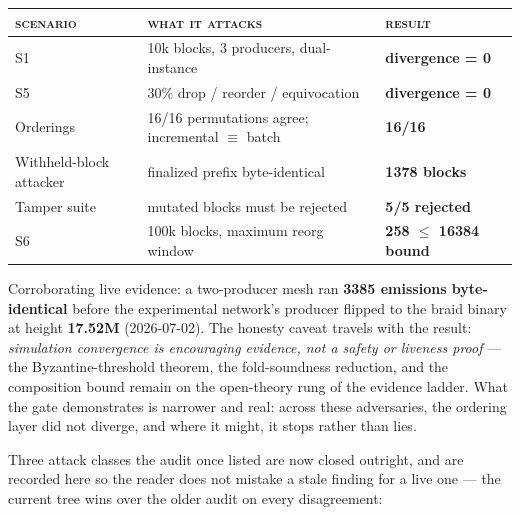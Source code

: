 \documentclass[10pt,a4paper]{article}
\newcommand{\measured}[1]{\textcolor{sigilcyan}{\textbf{#1}}}
\begin{document}
\begin{center}
\small
\begin{tabular}{@{}lp{9.4cm}l@{}}
\toprule
\textsc{scenario} & \textsc{what it attacks} & \textsc{result}\\
\midrule
S1 & 10k blocks, 3 producers, dual-instance & \measured{divergence = 0}\\
S5 & 30\% drop / reorder / equivocation & \measured{divergence = 0}\\
Orderings & 16/16 permutations agree; incremental $\equiv$ batch & \measured{16/16}\\
Withheld-block attacker & finalized prefix byte-identical & \measured{1378 blocks}\\
Tamper suite & mutated blocks must be rejected & \measured{5/5 rejected}\\
S6 & 100k blocks, maximum reorg window & \measured{258 $\leq$ 16384 bound}\\
\bottomrule
\end{tabular}
\end{center}

\noindent
Corroborating live evidence: a two-producer mesh ran \measured{3385 emissions
byte-identical} before the experimental network's producer flipped to the braid binary at
height \measured{17.52M} (2026-07-02). The honesty caveat travels with the result:
\emph{simulation convergence is encouraging evidence, not a safety or liveness proof} — the
Byzantine-threshold theorem, the fold-soundness reduction, and the composition bound remain
on the open-theory rung of the evidence ladder. What the gate demonstrates is narrower and
real: across these adversaries, the ordering layer did not diverge, and where it might, it
stops rather than lies.

Three attack classes the audit once listed are now closed outright, and are recorded here so
the reader does not mistake a stale finding for a live one — the current tree wins over the
older audit on every disagreement:
\end{document}
